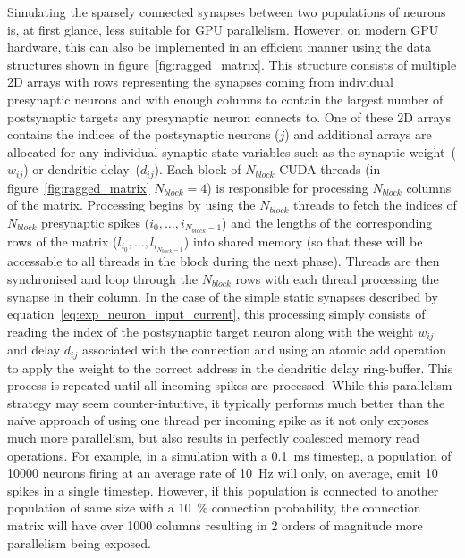 \documentclass[utf8]{frontiersSCNS} %
\begin{document}
Simulating the sparsely connected synapses between two populations of neurons is, at first glance, less suitable for GPU parallelism.
However, on modern GPU hardware, this can also be implemented in an efficient manner using the data structures shown in figure~\ref{fig:ragged_matrix}.
This structure consists of multiple 2D arrays with rows representing the synapses coming from individual presynaptic neurons and with enough columns to contain the largest number of postsynaptic targets any presynaptic neuron connects to.
One of these 2D arrays contains the indices of the postsynaptic neurons ($j$) and additional arrays are allocated for any individual synaptic state variables such as the synaptic weight~($w_{ij}$) or dendritic delay~($d_{ij}$).
Each block of $N_{block}$ CUDA threads (in figure~\ref{fig:ragged_matrix} $N_{block}=4$) is responsible for processing $N_{block}$ columns of the matrix.
Processing begins by using the $N_{block}$ threads to fetch the indices of $N_{block}$ presynaptic spikes ($i_{0},\ldots,i_{N_{block} - 1}$) and the lengths of the corresponding rows of the matrix ($l_{i_{0}},\ldots,l_{i_{N_{block} - 1}}$) into shared memory (so that these will be accessable to all threads in the block during the next phase).
Threads are then synchronised and loop through the $N_{block}$ rows with each thread processing the synapse in their column.
In the case of the simple static synapses described by equation~\ref{eq:exp_neuron_input_current}, this processing simply consists of reading the index of the postsynaptic target neuron along with the weight $w_{ij}$ and delay $d_{ij}$ associated with the connection and using an atomic add operation to apply the weight to the correct address in the dendritic delay ring-buffer.
This process is repeated until all incoming spikes are processed.
While this parallelism strategy may seem counter-intuitive, it typically performs much better than the naïve approach of using one thread per incoming spike as it not only exposes much more parallelism, but also results in perfectly coalesced memory read operations.
For example, in a simulation with a \SI{0.1}{\milli\second} timestep, a population of \num{10000} neurons firing at an average rate of \SI{10}{\hertz} will only, on average, emit \num{10} spikes in a single timestep.
However, if this population is connected to another population of same size with a \SI{10}{\percent} connection probability, the connection matrix will have over \num{1000} columns resulting in 2 orders of magnitude more parallelism being exposed.
\end{document}
